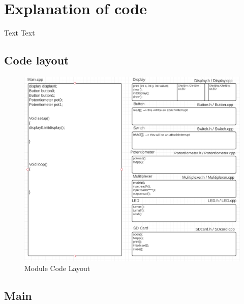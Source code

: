 \documentclass[11pt]{article}
\begin{document}
\section{Explanation of code}
Text Text
\subsection{Code layout}

\begin{figure}
  \includegraphics[width=\linewidth]{./Pics/code_layout.PNG}
  \caption{Module Code Layout}
  \label{fig:MCL1}
\end{figure}

\subsection{Main}
\end{document}
